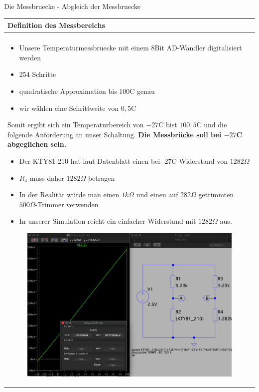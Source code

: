 \begin{frame}[t]{Die Messbruecke - Abgleich der Messbruecke} 
    
    \begin{spacing}{0.9} \begin{tiny}
      \begin{table}[h!]
      \begin{tabular}{p{10cm} }
        \hline
        \textbf{Definition des Messbereichs} \\
        \hline \\
        \begin{minipage}{\textwidth}
           \begin{itemize}
               \item Unsere Temperaturmessbruecke mit einem 8Bit AD-Wandler digitalisiert werden
               \item 254 Schritte
               \item quadratische Approximation bis $100$C genau
               \item wir wählen eine Schrittweite von $0,5$C
           \end{itemize}
           Somit ergibt sich ein Temperaturbereich von $-27$C bist $100,5$C und die folgende Anforderung an unser Schaltung.\newline\newline
           \textbf{Die Messbrücke soll bei $-27$C abgeglichen sein.}
           \begin{itemize}
               \item Der KTY81-210 hat laut Datenblatt einen bei -27C Widerstand von $1282\Omega$
               \item $R_4$ muss daher $1282\Omega$ betragen
               \item In der Realität würde man einen $1k\Omega$ und einen auf $282\Omega$ getrimmten $500\Omega$-Trimmer verwenden
               \item In unserer Simulation reicht ein einfacher Widerstand mit $1282\Omega$ aus.
           \end{itemize}
           \begin{figure}
               \includegraphics[width=0.5\linewidth]{pictures/kty81_getrimmet.png}
           \end{figure}
        \end{minipage}
       \\        
    \end{tabular}


\end{table}
\end{tiny}
\end{spacing}
\end{frame}
